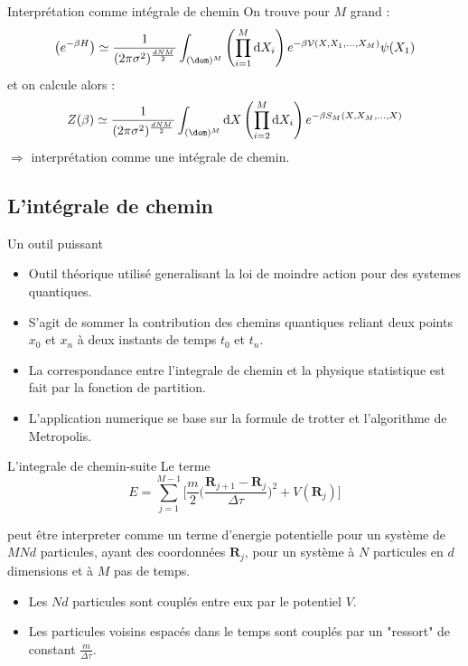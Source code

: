 \documentclass{beamer}
\begin{document}
\begin{frame}{Interprétation comme intégrale de chemin}
On trouve pour $M$ grand : 
    \begin{equation}
        \left(e^{-\beta H}\right) \simeq \frac{1}{(2\pi\sigma^2)^\frac{dNM}{2}}\int_{(\dom)^M} \left(\prod_{i=1}^{M}\mathrm{d}X_i\right) e^{-\beta \mathcal{V}(X,X_1,\ldots,X_M)}\psi(X_1)
    \end{equation}
et on calcule alors :
\begin{equation}
    Z(\beta)\simeq\frac{1}{(2\pi\sigma^2)^\frac{dNM}{2}}\int_{(\dom)^{M}} \mathrm{d}X\left(\prod_{i=2}^{M}\mathrm{d}X_i\right) e^{-\beta S_M(X,X_M,\ldots,X)}
\end{equation}
$\Rightarrow$ interprétation comme une intégrale de chemin.
\end{frame}

\subsection{L'intégrale de chemin}
\begin{frame}{Un outil puissant}
    \begin{itemize}
        \item 
        Outil théorique utilisé generalisant la loi de moindre action pour des systemes quantiques.
        \item 
        S'agit de sommer la contribution des chemins quantiques reliant deux points $x_0$ et $x_n$ à deux instants de temps $t_0$ et $t_n$. 
        \item 
        La correspondance entre l'integrale de chemin et la physique statistique est fait par la fonction de partition. 
        \pause 
        \item 
        L'application numerique se base sur la formule de trotter et l'algorithme de Metropolis.
    \end{itemize}
\end{frame}

\begin{frame}{L'integrale de chemin-suite}
Le terme
    \begin{equation} 
        \label{energie_trotter}
        E = \sum_{j=1}^{M-1}\Big[ \frac{m}{2} \Big( \frac{\mathbf{R}_{j+1} - \mathbf{R}_j}{\Delta \tau}\Big)^2  + V(\mathbf{R}_j) \Big]
    \end{equation}
    
    peut être interpreter comme un terme d'energie potentielle pour un système de $MNd$ particules, ayant des coordonnées $\mathbf{R}_{j}$, pour un système à $N$ particules en $d$ dimensions et à $M$ pas de temps.
    
    \begin{itemize}
        \item 
        Les $Nd$ particules sont couplés entre eux par le potentiel $V$. 
        \item 
        Les particules voisins espacés dans le temps sont couplés par un "ressort" de constant $\frac{m}{\Delta \tau}$. 
    \end{itemize}
\end{frame}
\end{document}
